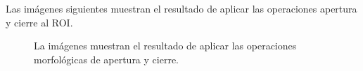 Las imágenes siguientes muestran el resultado de aplicar las operaciones apertura y cierre al ROI. 
\begin{figure}[h!]
\begin{center} 
   \qquad
{}  
\end{center}
\caption{La imágenes muestran el resultado de aplicar las operaciones morfológicas de apertura y cierre.}
\label{fig:HandNoNoises}
\end{figure}  

